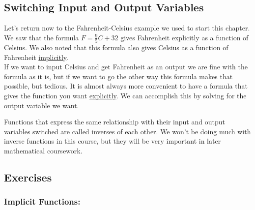 \subsection{Switching Input and Output Variables}

Let’s return now to the Fahrenheit-Celsius example we used to start this chapter. We saw that the formula $F=\frac{9}{5}C+32$ gives Fahrenheit explicitly as a function of Celsius. We also noted that this formula also gives Celsius as a function of Fahrenheit \underline{implicitly}.\\

If we want to input Celsius and get Fahrenheit as an output we are fine with the formula as it is, but if we want to go the other way this formula makes that possible, but tedious. It is almost always more convenient to have a formula that gives the function you want \underline{explicitly}. We can accomplish this by solving for the output variable we want.



Functions that express the same relationship with their input and output variables switched are called inverses of each other. We won’t be doing much with inverse functions in this course, but they will be very important in later mathematical coursework.

%
%

\clearpage

\subsection{Exercises}

\subsubsection*{Implicit Functions:}

